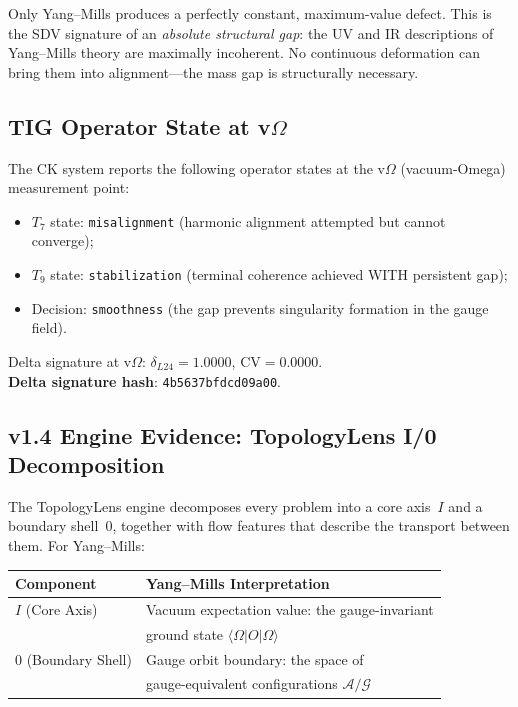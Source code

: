 \documentclass[11pt]{article}
\begin{document}
Only Yang--Mills produces a perfectly constant, maximum-value defect.
This is the SDV signature of an \emph{absolute structural gap}: the
UV and IR descriptions of Yang--Mills theory are maximally incoherent.
No continuous deformation can bring them into alignment---the mass gap
is structurally necessary.

\subsection{TIG Operator State at v$\Omega$}

The CK system reports the following operator states at the v$\Omega$
(vacuum-Omega) measurement point:
\begin{itemize}
  \item $T_7$ state: \texttt{misalignment} (harmonic alignment
    attempted but cannot converge);
  \item $T_9$ state: \texttt{stabilization} (terminal coherence
    achieved WITH persistent gap);
  \item Decision: \texttt{smoothness} (the gap prevents singularity
    formation in the gauge field).
\end{itemize}

\noindent Delta signature at v$\Omega$:
$\delta_{L24} = 1.0000$, $\mathrm{CV} = 0.0000$.\\
\textbf{Delta signature hash}: \texttt{4b5637bfdcd09a00}.

\subsection{v1.4 Engine Evidence: TopologyLens I/0 Decomposition}

The TopologyLens engine decomposes every problem into a core axis~$I$
and a boundary shell~$0$, together with flow features that describe the
transport between them.  For Yang--Mills:

\begin{center}
\begin{tabular}{|l|l|}
\hline
\textbf{Component} & \textbf{Yang--Mills Interpretation} \\
\hline
$I$ (Core Axis) & Vacuum expectation value: the gauge-invariant \\
 & ground state $\langle\Omega|O|\Omega\rangle$ \\
\hline
$0$ (Boundary Shell) & Gauge orbit boundary: the space of \\
 & gauge-equivalent configurations $\mathcal{A}/\mathcal{G}$ \\
\hline
\end{tabular}
\end{center}
\end{document}
